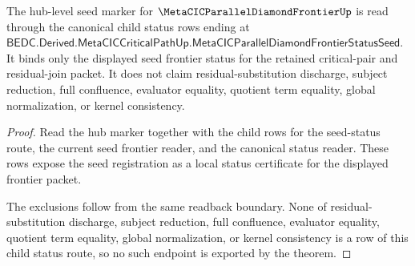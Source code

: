 \begin{theorem}\label{thm:metacic-parallel-diamond-frontier-rotation-seed-status-route}
The hub-level seed marker for $\MetaCICParallelDiamondFrontierUp$ is read through the canonical child status rows ending at
$\mathsf{BEDC.Derived.MetaCICCriticalPathUp.MetaCICParallelDiamondFrontierStatusSeed}$.
It binds only the displayed seed frontier status for the retained critical-pair and residual-join packet.
It does not claim residual-substitution discharge, subject reduction, full confluence, evaluator equality, quotient term equality, global normalization, or kernel consistency.
\end{theorem}
\begin{proof}
Read the hub marker together with the child rows for the seed-status route, the current seed frontier reader, and the canonical status reader. These rows expose the seed registration as a local status certificate for the displayed frontier packet.

The exclusions follow from the same readback boundary. None of residual-substitution discharge, subject reduction, full confluence, evaluator equality, quotient term equality, global normalization, or kernel consistency is a row of this child status route, so no such endpoint is exported by the theorem.
\end{proof}
